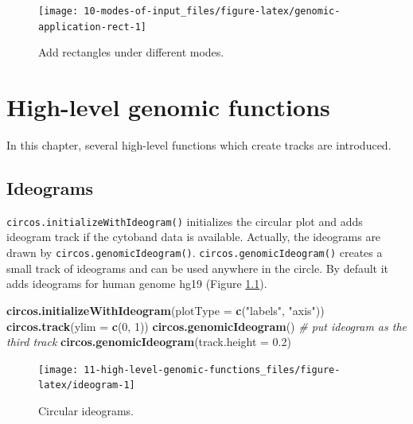 \documentclass[]{book}
\newenvironment{Shaded}{\begin{snugshade}}{\end{snugshade}}
\newcommand{\KeywordTok}[1]{\textcolor[rgb]{0.13,0.29,0.53}{\textbf{#1}}}
\newcommand{\DataTypeTok}[1]{\textcolor[rgb]{0.13,0.29,0.53}{#1}}
\newcommand{\DecValTok}[1]{\textcolor[rgb]{0.00,0.00,0.81}{#1}}
\newcommand{\FloatTok}[1]{\textcolor[rgb]{0.00,0.00,0.81}{#1}}
\newcommand{\StringTok}[1]{\textcolor[rgb]{0.31,0.60,0.02}{#1}}
\newcommand{\CommentTok}[1]{\textcolor[rgb]{0.56,0.35,0.01}{\textit{#1}}}
\newcommand{\NormalTok}[1]{#1}
\begin{document}
\begin{figure}

{\centering \texttt{[image: 10-modes-of-input\_files/figure-latex/genomic-application-rect-1]} 

}

\caption{Add rectangles under different modes.}\label{fig:genomic-application-rect}
\end{figure}

\chapter{High-level genomic
functions}\label{high-level-genomic-functions}

In this chapter, several high-level functions which create tracks are
introduced.

\section{Ideograms}\label{ideograms}

\texttt{circos.initializeWithIdeogram()} initializes the circular plot
and adds ideogram track if the cytoband data is available. Actually, the
ideograms are drawn by \texttt{circos.genomicIdeogram()}.
\texttt{circos.genomicIdeogram()} creates a small track of ideograms and
can be used anywhere in the circle. By default it adds ideograms for
human genome hg19 (Figure \ref{fig:ideogram}).

\begin{Shaded}
\begin{Highlighting}[]
\KeywordTok{circos.initializeWithIdeogram}\NormalTok{(}\DataTypeTok{plotType =} \KeywordTok{c}\NormalTok{(}\StringTok{"labels"}\NormalTok{, }\StringTok{"axis"}\NormalTok{))}
\KeywordTok{circos.track}\NormalTok{(}\DataTypeTok{ylim =} \KeywordTok{c}\NormalTok{(}\DecValTok{0}\NormalTok{, }\DecValTok{1}\NormalTok{))}
\KeywordTok{circos.genomicIdeogram}\NormalTok{() }\CommentTok{# put ideogram as the third track}
\KeywordTok{circos.genomicIdeogram}\NormalTok{(}\DataTypeTok{track.height =} \FloatTok{0.2}\NormalTok{)}
\end{Highlighting}
\end{Shaded}

\begin{figure}

{\centering \texttt{[image: 11-high-level-genomic-functions\_files/figure-latex/ideogram-1]} 

}

\caption{Circular ideograms.}\label{fig:ideogram}
\end{figure}
\end{document}
